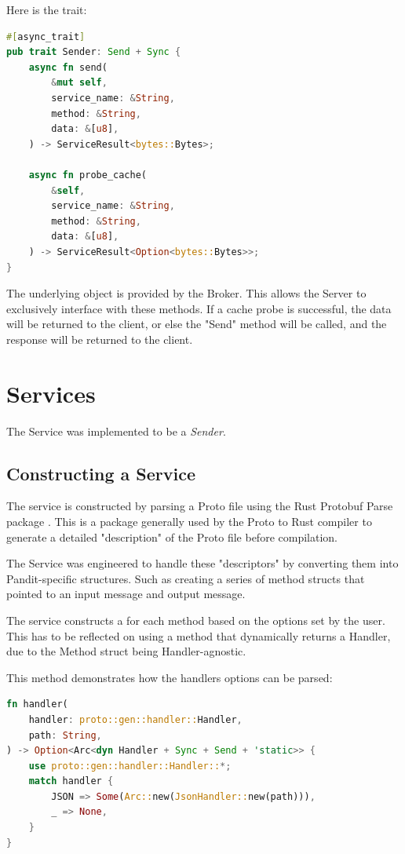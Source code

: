 \documentclass[a4paper,12pt]{report}
\begin{document}
Here is the trait:

\begin{lstlisting}[language=Rust]
#[async_trait]
pub trait Sender: Send + Sync {
    async fn send(
        &mut self,
        service_name: &String,
        method: &String,
        data: &[u8],
    ) -> ServiceResult<bytes::Bytes>;

    async fn probe_cache(
        &self,
        service_name: &String,
        method: &String,
        data: &[u8],
    ) -> ServiceResult<Option<bytes::Bytes>>;
}
\end{lstlisting}

The underlying object is provided by the Broker. This allows the Server to exclusively interface with these methods.
If a cache probe is successful, the data will be returned to the client, or else the "Send" method will be called, and the response will be returned to the client.

\section{Services}

The Service was implemented to be a \textit{Sender}.

\subsection{Constructing a Service}

The service is constructed by parsing a Proto file using the Rust Protobuf Parse package \cite{parse}. This is a package generally used by the Proto to Rust compiler to generate a detailed "description" of the Proto file before compilation.

The Service was engineered to handle these "descriptors" by converting them into Pandit-specific structures. Such as creating a series of method structs that pointed to an input message and output message.

The service constructs a  for each method based on the options set by the user. This has to be reflected on using a method that dynamically returns a Handler, due to the Method struct being Handler-agnostic.

This method demonstrates how the handlers options can be parsed:

\begin{lstlisting}[language=Rust]
fn handler(
    handler: proto::gen::handler::Handler,
    path: String,
) -> Option<Arc<dyn Handler + Sync + Send + 'static>> {
    use proto::gen::handler::Handler::*;
    match handler {
        JSON => Some(Arc::new(JsonHandler::new(path))),
        _ => None,
    }
}
\end{lstlisting}
\end{document}
